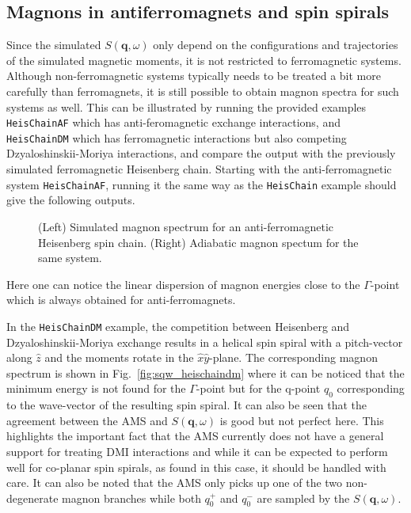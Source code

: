 \documentclass[11pt,fleqn,a4]{book} %
\begin{document}
\subsection{Magnons in antiferromagnets and spin spirals}
Since the simulated $S(\mathbf{q},\omega)$ only depend on the configurations and trajectories of the simulated magnetic moments, it is not restricted to ferromagnetic systems. Although non-ferromagnetic systems typically needs to be treated a bit more carefully than ferromagnets, it is still possible to obtain magnon spectra for such systems as well. This can be illustrated by running the provided examples \texttt{HeisChainAF} which has anti-feromagnetic exchange interactions, and \texttt{HeisChainDM} which has ferromagnetic interactions but also competing Dzyaloshinskii-Moriya interactions, and compare the output with the previously simulated ferromagnetic Heisenberg chain. Starting with the anti-ferromagnetic system \texttt{HeisChainAF}, running it the same way as the \texttt{HeisChain} example should give the following outputs.
\begin{figure}[h!]
\caption{(Left) Simulated magnon spectrum for an anti-ferromagnetic Heisenberg spin chain.
(Right) Adiabatic magnon spectum for the same system.}
\label{fig:sqw_heischainafm}
\end{figure}
Here one can notice the linear dispersion of magnon energies close to the $\Gamma$-point which is always obtained for anti-ferromagnets.
\par
In the \texttt{HeisChainDM} example, the competition between Heisenberg and Dzyaloshinskii-Moriya exchange results in a helical spin spiral with a pitch-vector along $\hat{z}$ and the moments rotate in the $\hat{x}\hat{y}$-plane. The corresponding magnon spectrum is shown in Fig.~\ref{fig:sqw_heischaindm} where it can be noticed that the minimum energy is not found for the $\Gamma$-point but for the q-point $q_0$ corresponding to the wave-vector of the resulting spin spiral. It can also be seen that the agreement between the AMS and $S(\mathbf{q},\omega)$ is good but not perfect here. This highlights the important fact that the AMS currently does not have a general support for treating DMI interactions and while it can be expected to perform well for co-planar spin spirals, as found in this case, it should be handled with care. It can also be noted that the AMS only picks up one of the two non-degenerate magnon branches while both $q^+_0$ and $q^-_0$ are sampled by the $S(\mathbf{q},\omega)$.
\end{document}
